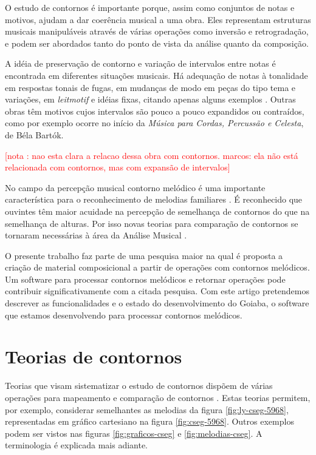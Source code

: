 \documentclass[brazil]{article}
\newcommand{\eng}[1]{\textit{#1}}
\newcommand{\opus}[1]{\textit{#1}}
\newcounter{notacounter}
\newcommand{\note}[1]{
  \addtocounter{notacounter}{1}
  \textcolor{red}{[nota \arabic{notacounter}: #1]}
}
\begin{document}

O estudo de contornos é importante porque, assim como conjuntos de
notas e motivos, ajudam a dar coerência musical a uma obra. Eles
representam estruturas musicais manipuláveis através de várias
operações como inversão e retrogradação, e podem ser abordados tanto
do ponto de vista da análise quanto da composição.

A idéia de preservação de contorno e variação de intervalos entre
notas é encontrada em diferentes situações musicais. Há adequação de
notas à tonalidade em respostas tonais de fugas, em mudanças de modo
em peças do tipo tema e variações, em \eng{leitmotif} e idéias fixas,
citando apenas alguns exemplos
\cite[p. 29]{morris87:composition}. Outras obras têm motivos cujos
intervalos são pouco a pouco expandidos ou contraídos, como por
exemplo ocorre no início da \opus{Música para Cordas, Percussão e
  Celesta}, de Béla Bartók. \note{nao esta clara a relacao dessa obra
  com contornos. marcos: ela não está relacionada com contornos, mas
  com expansão de intervalos}

No campo da percepção musical contorno melódico é uma importante
característica para o reconhecimento de melodias familiares \cite[p.
136]{dowling.ea86:music}. É reconhecido que ouvintes têm maior
acuidade na percepção de semelhança de contornos do que na semelhança
de alturas. Por isso novas teorias para comparação de contornos se
tornaram necessárias à área da Análise Musical
\cite[p. 226]{marvin.ea87:relating}.


O presente trabalho faz parte de uma pesquisa maior na qual é proposta
a criação de material composicional a partir de operações com
contornos melódicos. Um software para processar contornos melódicos e
retornar operações pode contribuir significativamente com a citada
pesquisa. Com este artigo pretendemos descrever as funcionalidades e o
estado do desenvolvimento do Goiaba, o software que estamos
desenvolvendo para processar contornos melódicos.

\section{Teorias de contornos}
\label{sec:teorias-de-contornos}

Teorias que visam sistematizar o estudo de contornos dispõem de várias
operações para mapeamento e comparação de contornos
\cite{friedmann85:methodology,friedmann87:response,morris87:composition,morris93:directions,marvin.ea87:relating,clifford95:contour,polansky.ea92:possible,quinn97:fuzzy,beard03:contour}. Estas
teorias permitem, por exemplo, considerar semelhantes as melodias da
figura \ref{fig:ly-cseg-5968}, representadas em gráfico cartesiano na
figura \ref{fig:cseg-5968}. Outros exemplos podem ser vistos nas
figuras \ref{fig:graficos-cseg} e \ref{fig:melodias-cseg}. A
terminologia é explicada mais adiante.
\end{document}
